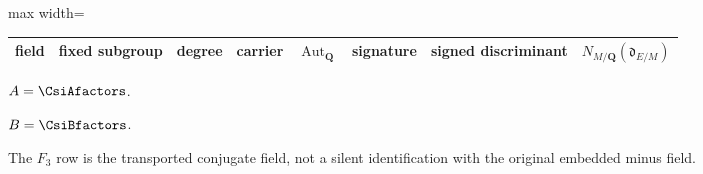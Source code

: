 \begingroup
\footnotesize
\setlength{\tabcolsep}{3.5pt}
\renewcommand{\arraystretch}{1.18}
\begin{adjustbox}{max width=\textwidth}
\begin{tabular}{@{}lccccccc@{}}
\toprule
field & fixed subgroup & degree & carrier & $\operatorname{Aut}_{\mathbf Q}$ & signature & signed discriminant & $N_{M/\mathbf Q}(\mathfrak d_{E/M})$ \\
\midrule
%
\end{tabular}
\end{adjustbox}
\par\smallskip
\scriptsize $A=\CsiAfactors$.
\par $B=\CsiBfactors$.
\par The $F_3$ row is the transported conjugate field, not a silent
identification with the original embedded minus field.
\endgroup
